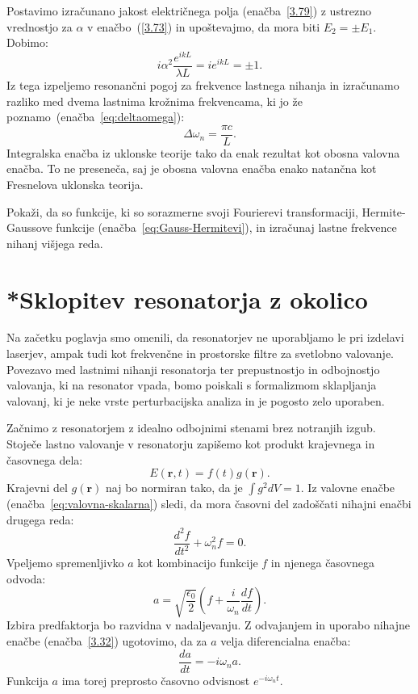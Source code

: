 Postavimo izračunano jakost električnega
polja (enačba~\ref{3.79}) z ustrezno vrednostjo za $\alpha$ v 
enačbo~(\ref{3.73}) in upoštevajmo, da mora biti
$E_{2}=\pm E_{1}$. Dobimo:
\begin{equation}
i\alpha^{2}\frac{e^{ikL}}{\lambda L}=ie^{ikL}=\pm1.
\label{3.80}
\end{equation}
Iz tega izpeljemo resonančni pogoj za frekvence lastnega nihanja 
in izračunamo razliko med dvema lastnima krožnima frekvencama, 
ki jo že poznamo~(enačba~\ref{eq:deltaomega}):
\begin{equation}
\Delta \omega_n=\frac{\pi c}{L}.
\label{3.81}
\end{equation}
Integralska enačba iz uklonske teorije tako da
enak rezultat kot obosna valovna enačba. To ne preseneča, saj je
obosna valovna enačba enako natančna kot Fresnelova uklonska teorija.
\begin{naloga}
Pokaži, da so funkcije, ki so sorazmerne svoji Fourierevi transformaciji, 
Hermite-Gaussove funkcije (enačba~\ref{eq:Gauss-Hermitevi}), 
in izračunaj lastne frekvence nihanj višjega reda.
\end{naloga}

\section{*Sklopitev resonatorja z okolico}
Na začetku poglavja smo omenili, da resonatorjev ne uporabljamo le pri 
izdelavi laserjev, ampak tudi kot frekvenčne in
prostorske filtre za svetlobno valovanje. Povezavo med lastnimi nihanji
resonatorja ter prepustnostjo in odbojnostjo valovanja, ki na resonator
vpada, bomo poiskali s formalizmom sklapljanja valovanj, 
ki je neke vrste perturbacijska analiza in je pogosto zelo uporaben.

Začnimo z resonatorjem z idealno odbojnimi stenami brez notranjih izgub. Stoječe
lastno valovanje v resonatorju zapišemo kot produkt krajevnega in časovnega
dela:
\begin{equation}
E(\mathbf{r},t)=f(t)g(\mathbf{r}).
\label{3.31}
\end{equation}
Krajevni del $g(\mathbf{r})$ naj bo normiran tako, da je $\int g^{2}dV=1$. Iz valovne
enačbe (enačba~\ref{eq:valovna-skalarna}) sledi, da mora časovni del zadoščati 
nihajni enačbi drugega reda:
\begin{equation}
\frac{d^2f}{dt^2} + \omega_{n}^{2}f=0.
\label{3.32}
\end{equation}
Vpeljemo spremenljivko $a$ kot kombinacijo funkcije $f$ in njenega
časovnega odvoda:
\begin{equation}
a=\sqrt{\frac{\epsilon_{0}}{2}}(f+\frac{i}{\omega_{n}}\frac{df}{dt}).
\label{3.33}
\end{equation}
Izbira predfaktorja bo razvidna v nadaljevanju. 
Z odvajanjem in uporabo nihajne enačbe (enačba~\ref{3.32}) ugotovimo, da za $a$ velja 
diferencialna enačba:
\begin{equation}
\frac{da}{dt}=-i\omega_{n}a.
\label{3.34}
\end{equation}
Funkcija $a$ ima torej preprosto časovno odvisnost $e^{-i\omega_{n}t}$.

